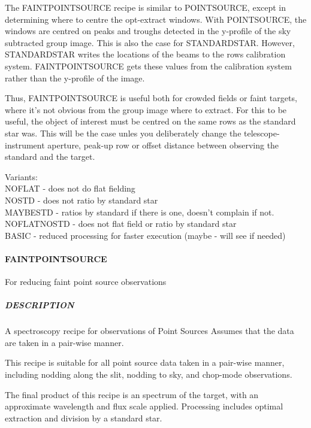 \documentclass[twoside,11pt]{article}
\renewcommand{\_}{\texttt{\symbol{95}}}
\begin{document}
The FAINT\_POINT\_SOURCE recipe is similar to POINT\_SOURCE, except in
determining where to centre the opt-extract windows. With
POINT\_SOURCE, the windows are centred on peaks and troughs detected
in the y-profile of the sky subtracted group image. This is also the
case for STANDARD\_STAR. However, STANDARD\_STAR writes the locations
of the beams to the rows calibration system. FAINT\_POINT\_SOURCE gets
these values from the calibration system rather than the y-profile of
the image. 

Thus, FAINT\_POINT\_SOURCE is useful both for crowded fields or
faint targets, where it's not obvious from the group image where to
extract. For this to be useful, the object of interest must be centred
on the same rows as the standard star was. This will be the case unles
you deliberately change the telescope-instrument aperture, peak-up row
or offset distance between observing the standard and the target.

Variants: \\
\_NOFLAT - does not do flat fielding \\
\_NOSTD - does not ratio by standard star \\
\_MAYBESTD - ratios by standard if there is one, doesn't complain if not. \\
\_NOFLAT\_NOSTD - does not flat field or ratio by standard star \\
\_BASIC - reduced processing for faster execution (maybe - will see if needed) \\

\paragraph*{FAINT\_POINT\_SOURCE\label{FAINT_POINT_SOURCE}}

For reducing faint point source observations

\subparagraph*{DESCRIPTION\label{FAINT_POINT_SOURCE_DESCRIPTION}}

A spectroscopy recipe for observations of Point Sources
Assumes that the data are taken in a pair-wise manner.



This recipe is suitable for all point source data taken in a pair-wise
manner, including nodding along the slit, nodding to sky, and
chop-mode observations.



The final product of this recipe is an spectrum of the target, with an
approximate wavelength and flux scale applied. Processing includes
optimal extraction and division by a standard star.
\end{document}
